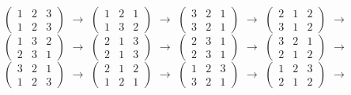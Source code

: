 \documentclass[12pt]{article}
\begin{document}
\noindent
 {\footnotesize$\left(\begin{array}{ccc} 1 & 2 & 3 \\ 1 & 2 & 3   \end{array}\right)$} $\rightarrow$
 {\footnotesize$\left(\begin{array}{ccc} 1 & 2 & 1 \\ 1 & 3 & 2   \end{array}\right)$} $\rightarrow$
 {\footnotesize$\left(\begin{array}{ccc} 3 & 2 & 1 \\ 3 & 2 & 1   \end{array}\right)$} $\rightarrow$
 {\footnotesize$\left(\begin{array}{ccc} 2 & 1 & 2 \\ 3 & 1 & 2   \end{array}\right)$} $\rightarrow$
 {\footnotesize$\left(\begin{array}{ccc} 1 & 3 & 2 \\ 2 & 3 & 1   \end{array}\right)$} $\rightarrow$
 {\footnotesize$\left(\begin{array}{ccc} 2 & 1 & 3 \\ 2 & 1 & 3   \end{array}\right)$} $\rightarrow$
 {\footnotesize$\left(\begin{array}{ccc} 2 & 3 & 1 \\ 2 & 3 & 1   \end{array}\right)$} $\rightarrow$
 {\footnotesize$\left(\begin{array}{ccc} 3 & 2 & 1 \\ 2 & 1 & 2   \end{array}\right)$} $\rightarrow$
{\footnotesize$\left(\begin{array}{ccc} 3 & 2 & 1 \\ 1 & 2 & 3   \end{array}\right)$} $\rightarrow$
{\footnotesize$\left(\begin{array}{ccc} 2 & 1 & 2 \\ 1 & 2 & 1   \end{array}\right)$} $\rightarrow$
{\footnotesize$\left(\begin{array}{ccc} 1 & 2 & 3 \\ 3 & 2 & 1   \end{array}\right)$} $\rightarrow$
{\footnotesize$\left(\begin{array}{ccc} 1 & 2 & 3 \\ 2 & 1 & 2   \end{array}\right)$} $\rightarrow$
\end{document}
